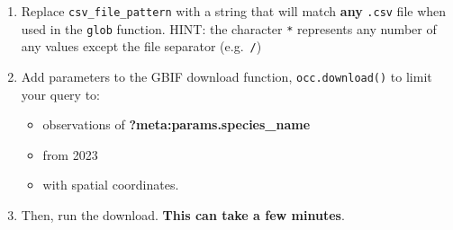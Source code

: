 \documentclass[
  letterpaper,
  DIV=11,
  numbers=noendperiod,
  oneside]{scrreprt}
\providecommand{\tightlist}{%
  \setlength{\itemsep}{0pt}\setlength{\parskip}{0pt}}
\begin{document}
\begin{tcolorbox}[enhanced jigsaw, colbacktitle=quarto-callout-color!10!white, opacityback=0, bottomtitle=1mm, toptitle=1mm, bottomrule=.15mm, left=2mm, colframe=quarto-callout-color-frame, leftrule=.75mm, opacitybacktitle=0.6, colback=white, rightrule=.15mm, toprule=.15mm, breakable, titlerule=0mm, title=\textcolor{quarto-callout-color}{\faInfo}\hspace{0.5em}{Try It: Submit a request to GBIF}, coltitle=black, arc=.35mm]

\begin{enumerate}
\def\labelenumi{\arabic{enumi}.}
\item
  Replace \texttt{csv\_file\_pattern} with a string that will match
  \textbf{any} \texttt{.csv} file when used in the \texttt{glob}
  function. HINT: the character \texttt{*} represents any number of any
  values except the file separator (e.g.~\texttt{/})
\item
  Add parameters to the GBIF download function, \texttt{occ.download()}
  to limit your query to:

  \begin{itemize}
  \tightlist
  \item
    observations of \textbf{?meta:params.species\_name}
  \item
    from 2023
  \item
    with spatial coordinates.
  \end{itemize}
\item
  Then, run the download. \textbf{This can take a few minutes}.
\end{enumerate}

\end{tcolorbox}
\end{document}
